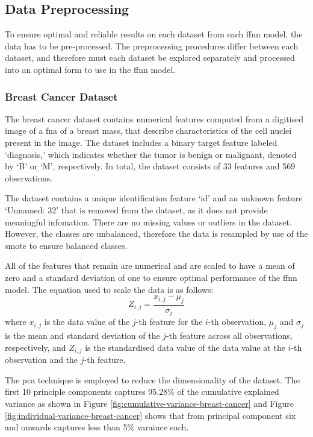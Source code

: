 \documentclass[10pt, conference]{IEEEtran}
\begin{document}
\subsection{Data Preprocessing}

To ensure optimal and reliable results on each dataset from each \acrshort{ffnn} model, the data has to be pre-processed.
The preprocessing procedures differ between each dataset, and therefore must each dataset be explored separately and
processed into an optimal form to use in the \acrshort{ffnn} model.

\subsubsection{Breast Cancer Dataset}

The breast cancer dataset contains numerical features computed from a digitised image
of a \acrfull{fna} of a breast mass, that describe characteristics of the cell nuclei present in the image.
The dataset includes a binary target feature labeled `diagnosis,' which indicates whether the tumor is
benign or malignant, denoted by `B' or `M', respectively. In total, the dataset consists of 33 features
and 569 observations.

The dataset contains a unique identification feature `id' and an unknown feature `Unnamed: 32' that is removed from
the dataset, as it does not provide meaningful infomation. There are no missing values or outliers in the dataset.
However, the classes are unbalanced, therefore the data is resampled by use of the \acrfull{smote} to ensure
balanced classes.

All of the features that remain are numerical and are scaled to have a mean of zero and a standard deviation of one
to ensure optimal performance of the \acrshort{ffnn} model. The equation used to scale the data is as follows:
\begin{equation}
    Z_{i,j} = \frac{x_{i,j} - \mu_j}{\sigma_j} \label{eq: standardise}
\end{equation}
where $x_{i,j}$ is the data value of the $j$-th feature for the $i$-th observation, $\mu_j$ and $\sigma_j$ is the
mean and standard deviation of the $j$-th feature across all observations, respectively, and $Z_{i,j}$
is the standardised data value of the data value at the $i$-th observation and the $j$-th feature.

The \acrfull{pca} technique is employed to reduce the dimensionality of the dataset. The first 10 principle
components captures 95.28\% of the cumulative explained variance as shown in Figure
\ref{fig:cumulative-variance-breast-cancer} and Figure \ref{fig:individual-variance-breast-cancer}
shows that from principal component six and onwards captures less than 5\% varaince each.
\end{document}
